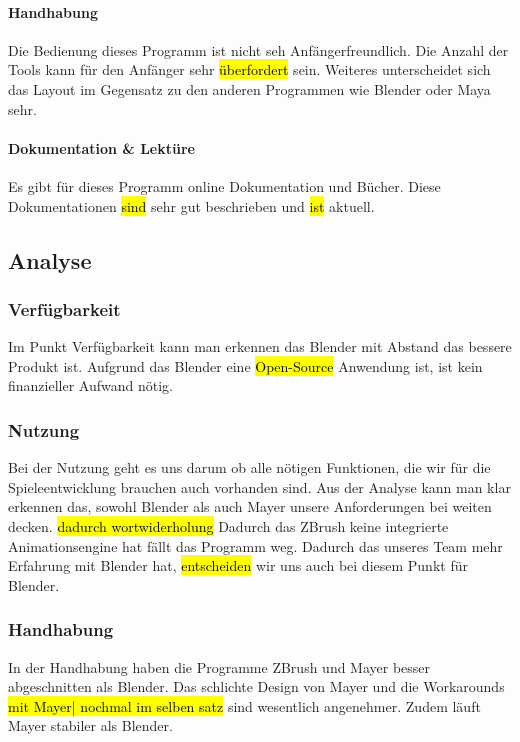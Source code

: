 \paragraph{Handhabung}
Die Bedienung dieses Programm ist nicht seh Anfängerfreundlich. Die Anzahl der Tools kann für den Anfänger sehr \hl{überfordert} sein. Weiteres unterscheidet sich das Layout im Gegensatz zu den anderen Programmen wie Blender oder Maya sehr.

\paragraph{Dokumentation \& Lektüre}
Es gibt für dieses Programm online Dokumentation und Bücher. Diese Dokumentationen \hl{sind} sehr gut beschrieben und \hl{ist} aktuell.

\pagebreak

\subsection{Analyse}
\subsubsection{Verfügbarkeit}
Im Punkt Verfügbarkeit kann man erkennen das Blender mit Abstand das bessere Produkt ist. Aufgrund das Blender eine \hl{Open-Source} Anwendung ist, ist kein finanzieller Aufwand nötig.

\subsubsection{Nutzung}
Bei der Nutzung geht es uns darum ob alle nötigen Funktionen, die wir für die Spieleentwicklung brauchen auch vorhanden sind. Aus der Analyse kann man klar erkennen das, sowohl Blender als auch Mayer unsere Anforderungen bei weiten decken. \hl{dadurch wortwiderholung} Dadurch das ZBrush keine integrierte Animationsengine hat fällt das Programm weg. Dadurch das unseres Team mehr Erfahrung mit Blender hat, \hl{entscheiden} wir uns auch bei diesem Punkt für Blender.

\subsubsection{Handhabung}
In der Handhabung haben die Programme ZBrush und Mayer besser abgeschnitten als Blender. Das schlichte Design von Mayer und die Workarounds \hl{mit Mayer| nochmal im selben satz} sind wesentlich angenehmer. Zudem läuft Mayer stabiler als Blender.

